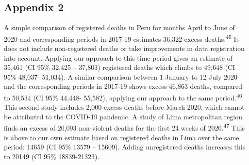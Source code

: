 \documentclass[
]{article}
\begin{document}
\hypertarget{appendix-2}{%
\subsection{Appendix 2}\label{appendix-2}}

A simple comparison of registered deaths in Peru for months April to June of 2020 and corresponding periods in 2017-19 estimates 36,322 excess deaths.\textsuperscript{45} It does not include non-registered deaths or take improvements in data registration into account. Applying our approach to this time period gives an estimate of 35,461 (CI 95\% 32,425 -- 37,803) registered deaths which climbs to 49,648 (CI 95\% 48,037- 51,034). A similar comparison between 1 January to 12 July 2020 and the corresponding periods in 2017-19 shows excess 46,863 deaths, compared to 50,534 (CI 95\% 44,448- 55,582), applying our approach to the same period.\textsuperscript{46} This second study includes 2,000 excess deaths before March 2020, which cannot be attributed to the COVID-19 pandemic. A study of Lima metropolitan region finds an excess of 20,093 non-violent deaths for the first 24 weeks of 2020.\textsuperscript{47} This is above to our own estimate based on registered deaths in Lima over the same period: 14659 (CI 95\% 13579 -- 15609). Adding unregistered deaths increases this to 20149 (CI 95\% 18839-21323).
\end{document}
